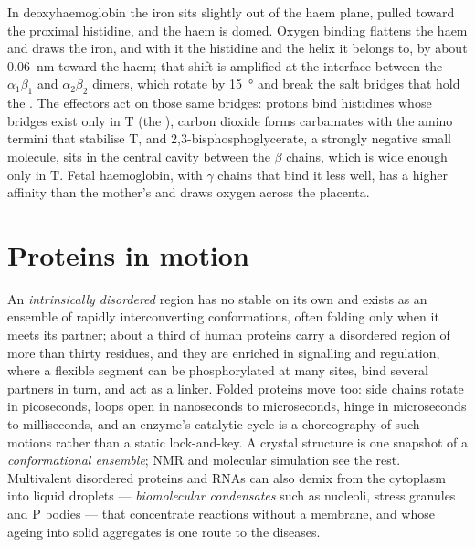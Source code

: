 \begin{proposition}\label{prop:b3:structural-biology:mechanism}
In deoxyhaemoglobin the iron sits slightly out of the haem plane,
pulled toward the proximal histidine, and the haem is domed. Oxygen
binding flattens the haem and draws the iron, and with it the
histidine and the helix it belongs to, by about \qty{0.06}{nm} toward
the haem; that shift is amplified at the interface between the
$\alpha_{1}\beta_{1}$ and $\alpha_{2}\beta_{2}$ dimers, which rotate by
\qty{15}{\degree} and break the salt bridges that hold the .
The effectors act on those same bridges: protons bind histidines whose
bridges exist only in T (the ), carbon dioxide forms
carbamates with the amino termini that stabilise T, and
2,3-bisphosphoglycerate, a strongly negative small molecule, sits in
the central cavity between the $\beta$ chains, which is wide enough
only in T. Fetal haemoglobin, with $\gamma$ chains that bind it less
well, has a higher affinity than the mother's and draws oxygen across
the placenta.
\end{proposition}

\section{Proteins in motion}

\begin{definition}\label{def:b3:structural-biology:disorder}
An \emph{intrinsically disordered} region has no stable  on its own
and exists as an ensemble of rapidly interconverting conformations,
often folding only when it meets its partner; about a third of human
proteins carry a disordered region of more than thirty residues, and
they are enriched in signalling and regulation, where a flexible
segment can be phosphorylated at many sites, bind several partners in
turn, and act as a linker. Folded proteins move too: side chains
rotate in picoseconds, loops open in nanoseconds to microseconds,
 hinge in microseconds to milliseconds, and an enzyme's
catalytic cycle is a choreography of such motions rather than a static
lock-and-key. A crystal structure is one snapshot of a
\emph{conformational ensemble}; NMR and molecular simulation see the
rest. Multivalent disordered proteins and RNAs can also demix from the
cytoplasm into liquid droplets --- \emph{biomolecular condensates} such
as nucleoli, stress granules and P bodies --- that concentrate reactions
without a membrane, and whose ageing into solid aggregates is one route
to the  diseases.
\end{definition}


